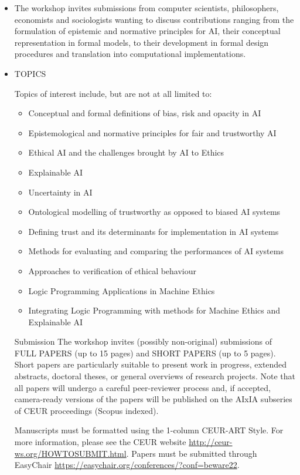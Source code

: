\documentclass[prodmode,acmtecs]{acmsmall} %
\begin{document}
\begin{itemize}\item  The workshop invites submissions from computer scientists, philosophers, economists and sociologists wanting to discuss contributions ranging from the formulation of epistemic and normative principles for AI, their conceptual representation in formal models, to their development in formal design procedures and translation into computational implementations. 
 
\item  TOPICS 
 
  Topics of interest include, but are not at all limited to: 
 
\begin{itemize}\item  Conceptual and formal definitions of bias, risk and opacity in AI 
\item  Epistemological and normative principles for fair and trustworthy AI 
\item  Ethical AI and the challenges brought by AI to Ethics 
\item  Explainable AI 
\item  Uncertainty in AI 
\item  Ontological modelling of trustworthy as opposed to biased AI systems 
\item  Defining trust and its determinants for implementation in AI systems 
\item  Methods for evaluating and comparing the performances of AI systems 
\item  Approaches to verification of ethical behaviour 
\item  Logic Programming Applications in Machine Ethics 
\item  Integrating Logic Programming with methods for Machine Ethics and Explainable AI
\end{itemize} 
  Submission The workshop invites (possibly non-original) submissions of FULL PAPERS (up to 15 pages) and SHORT PAPERS (up to 5 pages). Short papers are particularly suitable to present work in progress, extended abstracts, doctoral theses, or general overviews of research projects. Note that all papers will undergo a careful peer-reviewer process and, if accepted, camera-ready versions of the papers will be published on the AIxIA subseries of CEUR proceedings (Scopus indexed). 
 
  Manuscripts must be formatted using the 1-column CEUR-ART Style. For more information, please see the CEUR website \href{http://ceur-ws.org/HOWTOSUBMIT.html}{http://ceur-ws.org/HOWTOSUBMIT.html}. Papers must be submitted through EasyChair \href{https://easychair.org/conferences/?conf=beware22}{https://easychair.org/conferences/?conf=beware22}. 
 

\end{itemize}
\end{document}
